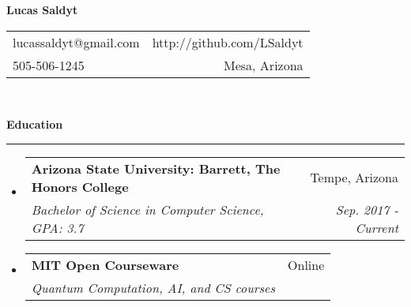 \documentclass[letterpaper,11pt]{article}
\makeatletter
\newcommand{\sectionline}{
    \noindent\rule[0.5ex]{\linewidth}{0.5pt}
}
\newcommand{\resitem}[1]{\item[] #1 \vspace{-3pt}}
\newcommand{\resheading}[1]{
    {\large \textbf{#1}}
    \sectionline
}
\newcommand{\colfill}{@{\extracolsep{\fill}}}
\newcommand{\ressubheading}[4]{
\begin{tabular*}{6.5in}{l\colfill r}
		\textbf{#1} & #2 \\
		\textit{#3} & \textit{#4} \\
\end{tabular*}\vspace{-6pt}}
\makeatother
\begin{document}
\begin{center}
\textbf{\Large Lucas Saldyt}
\end{center}
\begin{tabular*}{7in}{l \colfill r}
lucassaldyt@gmail.com & http://github.com/LSaldyt\\
505-506-1245 & Mesa, Arizona \\
\end{tabular*}
\\

\vspace{0.1in}

\resheading{Education}
\begin{itemize}
\item[]
    \ressubheading{Arizona State University: Barrett, The Honors College}{Tempe, Arizona}{Bachelor of Science in Computer Science, GPA: 3.7}{Sep. 2017 - Current}
\item[]
    \ressubheading{MIT Open Courseware}{Online}{Quantum Computation, AI, and CS courses}{}

\end{itemize}

\vspace{0.1in}
\end{document}
